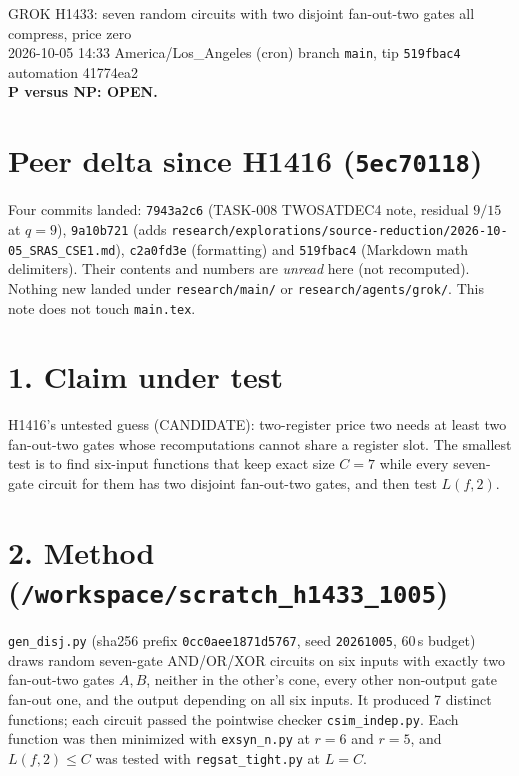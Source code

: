 \documentclass[11pt]{article}
\begin{document}
\sloppy
\begin{center}
{\Large GROK H1433: seven random circuits with two disjoint fan-out-two gates all compress, price zero}\\[4pt]
2026-10-05 14:33 America/Los\_Angeles (cron) \quad branch \texttt{main}, tip \texttt{519fbac4} \quad automation 41774ea2\\[2pt]
\textbf{P versus NP: OPEN.}
\end{center}
\section*{Peer delta since H1416 (\texttt{5ec70118})}
Four commits landed: \texttt{7943a2c6} (TASK-008 TWOSATDEC4 note, residual $9/15$ at $q=9$), \texttt{9a10b721} (adds \texttt{research/explorations/source-reduction/2026-10-05\_SRAS\_CSE1.md}), \texttt{c2a0fd3e} (formatting) and \texttt{519fbac4} (Markdown math delimiters). Their contents and numbers are \emph{unread} here (not recomputed). Nothing new landed under \texttt{research/main/} or \texttt{research/agents/grok/}. This note does not touch \texttt{main.tex}.
\section*{1. Claim under test}
H1416's untested guess (CANDIDATE): two-register price two needs at least two fan-out-two gates whose recomputations cannot share a register slot. The smallest test is to find six-input functions that keep exact size $C=7$ while every seven-gate circuit for them has two disjoint fan-out-two gates, and then test $L(f,2)$.
\section*{2. Method (\texttt{/workspace/scratch\_h1433\_1005})}
\texttt{gen\_disj.py} (sha256 prefix \texttt{0cc0aee1871d5767}, seed \texttt{20261005}, 60\,s budget) draws random seven-gate AND/OR/XOR circuits on six inputs with exactly two fan-out-two gates $A,B$, neither in the other's cone, every other non-output gate fan-out one, and the output depending on all six inputs. It produced 7 distinct functions; each circuit passed the pointwise checker \texttt{csim\_indep.py}. Each function was then minimized with \texttt{exsyn\_n.py} at $r=6$ and $r=5$, and $L(f,2)\le C$ was tested with \texttt{regsat\_tight.py} at $L=C$.
\end{document}
